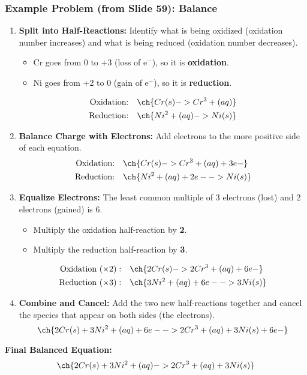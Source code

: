 \documentclass{article}
\begin{document}
\subsubsection*{Example Problem (from Slide 59): Balance }
\begin{enumerate}[label=\textbf{Step \arabic*:}, itemsep=5pt]
    \item \textbf{Split into Half-Reactions:} Identify what is being oxidized (oxidation number increases) and what is being reduced (oxidation number decreases).
    \begin{itemize}
        \item Cr goes from 0 to +3 (loss of e$^{-}$), so it is \textbf{oxidation}.
        \item Ni goes from +2 to 0 (gain of e$^{-}$), so it is \textbf{reduction}.
    \end{itemize}
    \begin{align*}
        \text{Oxidation:} & \quad \ch{Cr(s) -> Cr^3+(aq)} \\
        \text{Reduction:} & \quad \ch{Ni^2+(aq) -> Ni(s)}
    \end{align*}
    \item \textbf{Balance Charge with Electrons:} Add electrons to the more positive side of each equation.
    \begin{align*}
        \text{Oxidation:} & \quad \ch{Cr(s) -> Cr^3+(aq) + 3e-} \\
        \text{Reduction:} & \quad \ch{Ni^2+(aq) + 2e- -> Ni(s)}
    \end{align*}
    \item \textbf{Equalize Electrons:} The least common multiple of 3 electrons (lost) and 2 electrons (gained) is 6.
    \begin{itemize}
        \item Multiply the oxidation half-reaction by \textbf{2}.
        \item Multiply the reduction half-reaction by \textbf{3}.
    \end{itemize}
    \begin{align*}
        \text{Oxidation } (\times 2): & \quad \ch{2Cr(s) -> 2Cr^3+(aq) + 6e-} \\
        \text{Reduction } (\times 3): & \quad \ch{3Ni^2+(aq) + 6e- -> 3Ni(s)}
    \end{align*}
    \item \textbf{Combine and Cancel:} Add the two new half-reactions together and cancel the species that appear on both sides (the electrons).
    \[ \ch{2Cr(s) + 3Ni^2+(aq) + 6e- -> 2Cr^3+(aq) + 3Ni(s) + 6e-} \]
\end{enumerate}
\textbf{Final Balanced Equation:} \[\ch{2Cr(s) + 3Ni^2+(aq) -> 2Cr^3+(aq) + 3Ni(s)}\]


\end{document}
